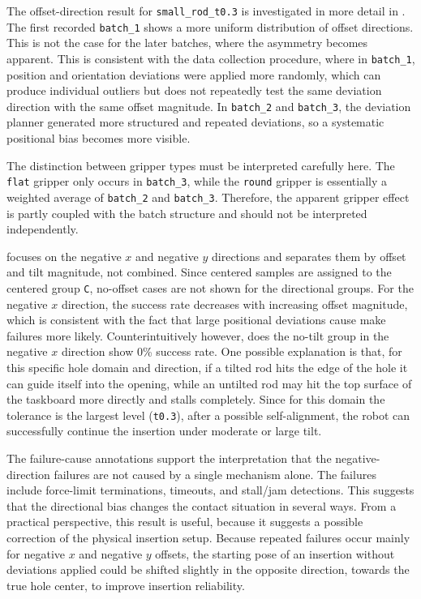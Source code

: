 The offset-direction result for \texttt{small\_rod\_t0.3} is investigated in more detail in . The first recorded \texttt{batch\_1} shows a more uniform distribution of offset directions. This is not the case for the later batches, where the asymmetry becomes apparent. This is consistent with the data collection procedure, where in \texttt{batch\_1}, position and orientation deviations were applied more randomly, which can produce individual outliers but does not repeatedly test the same deviation direction with the same offset magnitude. In \texttt{batch\_2} and \texttt{batch\_3}, the deviation planner generated more structured and repeated deviations, so a systematic positional bias becomes more visible.

The distinction between gripper types must be interpreted carefully here. The \texttt{flat} gripper only occurs in \texttt{batch\_3}, while the \texttt{round} gripper is essentially a weighted average of \texttt{batch\_2} and \texttt{batch\_3}. Therefore, the apparent gripper effect is partly coupled with the batch structure and should not be interpreted independently.

 focuses on the negative $x$ and negative $y$ directions and separates them by offset and tilt magnitude, not combined. Since centered samples are assigned to the centered group \texttt{C}, no-offset cases are not shown for the directional groups. For the negative $x$ direction, the success rate decreases with increasing offset magnitude, which is consistent with the fact that large positional deviations cause make failures more likely. Counterintuitively however, does the no-tilt group in the negative $x$ direction show 0\% success rate. One possible explanation is that, for this specific hole domain and direction, if a tilted rod hits the edge of the hole it can guide itself into the opening, while an untilted rod may hit the top surface of the taskboard more directly and stalls completely. Since for this domain the tolerance is the largest level (\texttt{t0.3}), after a possible self-alignment, the robot can successfully continue the insertion under moderate or large tilt.

The failure-cause annotations support the interpretation that the negative-direction failures are not caused by a single mechanism alone. The failures include force-limit terminations, timeouts, and stall/jam detections. This suggests that the directional bias changes the contact situation in several ways. From a practical perspective, this result is useful, because it suggests a possible correction of the physical insertion setup. Because repeated failures occur mainly for negative $x$ and negative $y$ offsets, the starting pose of an insertion without deviations applied could be shifted slightly in the opposite direction, towards the true hole center, to improve insertion reliability.

